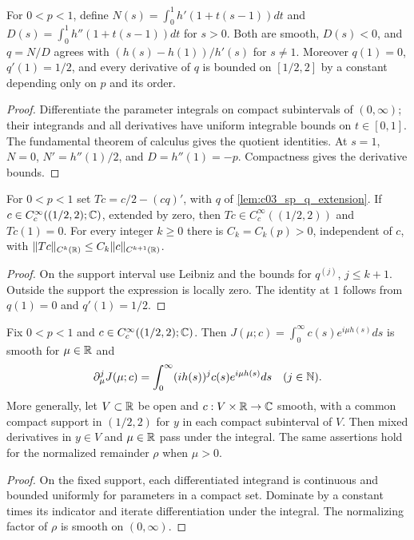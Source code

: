 \begin{lemma}
  \label{lem:c03_sp_q_extension}
  For $0<p<1$, define
  $N(s)=\int_0^1h'(1+t(s-1))dt$ and $D(s)=\int_0^1h''(1+t(s-1))dt$ for $s>0$.
  Both are smooth, $D(s)<0$, and $q=N/D$ agrees with $(h(s)-h(1))/h'(s)$ for $s\ne1$.
  Moreover $q(1)=0$, $q'(1)=1/2$, and every derivative of $q$ is bounded on $[1/2,2]$
  by a constant depending only on $p$ and its order.
\end{lemma}
\begin{proof}
  Differentiate the parameter integrals on compact subintervals of $(0,\infty)$;
  their integrands and all derivatives have uniform integrable bounds on $t\in[0,1]$.
  The fundamental theorem of calculus gives the quotient identities. At $s=1$,
  $N=0$, $N'=h''(1)/2$, and $D=h''(1)=-p$. Compactness gives the derivative bounds.
\end{proof}

\begin{lemma}
  \label{lem:c03_sp_T_bounds}
  For $0<p<1$ set $Tc=c/2-(cq)'$, with $q$ of \cref{lem:c03_sp_q_extension}.
  If $c\in C_c^\infty((1/2,2);\mathbb{C})$, extended by zero, then
  $Tc\in C_c^\infty((1/2,2))$ and $Tc(1)=0$.
  For every integer $k\ge0$ there is $C_k=C_k(p)>0$, independent of $c$, with
  $\|Tc\|_{C^k(\mathbb{R})}\le C_k\|c\|_{C^{k+1}(\mathbb{R})}$.
\end{lemma}
\begin{proof}
  On the support interval use Leibniz and the bounds for $q^{(j)}$, $j\le k+1$.
  Outside the support the expression is locally zero. The identity at $1$ follows from
  $q(1)=0$ and $q'(1)=1/2$.
\end{proof}

\begin{lemma}
  \label{lem:c03_sp_J_parameter}
  Fix $0<p<1$ and $c\in C_c^\infty((1/2,2);\mathbb{C})$.
  Then $J(\mu;c)=\int_0^\infty c(s)e^{i\mu h(s)}ds$ is smooth for $\mu\in\mathbb{R}$ and
  \[
    \partial_\mu^jJ(\mu;c)=\int_0^\infty (ih(s))^j c(s)e^{i\mu h(s)}ds
    \quad(j\in\mathbb{N}).
  \]
  More generally, let $V\subset\mathbb{R}$ be open and $c:V\times\mathbb{R}\to\mathbb{C}$ smooth, with
  a common compact support in $(1/2,2)$ for $y$ in each compact subinterval of $V$.
  Then mixed derivatives in $y\in V$ and $\mu\in\mathbb{R}$ pass under the integral. The same assertions hold for the normalized remainder
  $\rho$ when $\mu>0$.
\end{lemma}
\begin{proof}
  On the fixed support, each differentiated integrand is continuous and bounded uniformly
  for parameters in a compact set. Dominate by a constant times its indicator and iterate
  differentiation under the integral. The normalizing factor of $\rho$ is smooth on $(0,\infty)$.
\end{proof}

